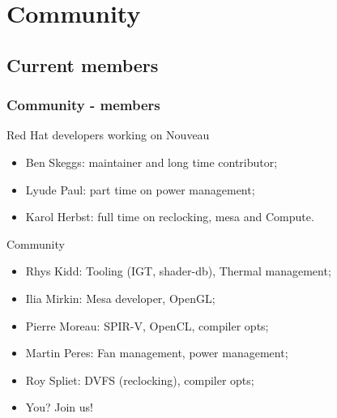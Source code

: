 \documentclass[11pt,english,compress]{beamer}
\begin{document}
\section{Community}

\subsection{Current members}
\begin{frame}
	\frametitle{Community - members}

	\begin{block}{Red Hat developers working on Nouveau}
		\begin{itemize}
			\item Ben Skeggs: maintainer and long time contributor;
			\item Lyude Paul: part time on power management;
			\item Karol Herbst: full time on reclocking, mesa and Compute.
		\end{itemize}
	\end{block}

	\pause

	\begin{block}{Community}
		\begin{itemize}
			\item Rhys Kidd: Tooling (IGT, shader-db), Thermal management;
			\item Ilia Mirkin: Mesa developer, OpenGL;
			\item Pierre Moreau: SPIR-V, OpenCL, compiler opts;
			\item Martin Peres: Fan management, power management;
			\item Roy Spliet: DVFS (reclocking), compiler opts;
			\item You? Join us!
		\end{itemize}
	\end{block}
\end{frame}
\end{document}
